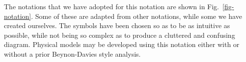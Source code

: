 \documentclass{llncs}
\begin{document}
The notations that we have adopted for this notation are shown in
Fig.~\ref{fig-notation}. Some of these are adapted from other notations,
while some we have created ourselves. The symbols have been chosen so as
to be as intuitive as possible, while not being so complex as to produce
a cluttered and confusing diagram. Physical models may be developed
using this notation either with or without a prior Beynon-Davies style
analysis.

\begin{figure}
	\centering
	\hfill
	\hfill
		\\
	\hfill

\end{figure}
\end{document}
